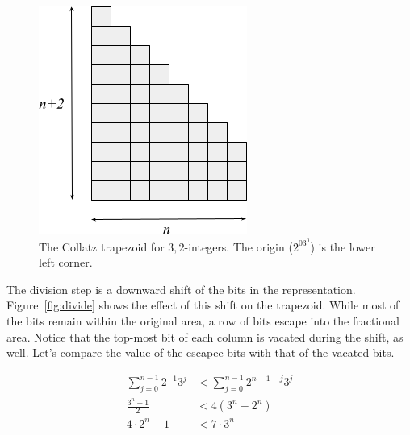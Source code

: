 \documentclass{article}
\begin{document}
\begin{figure}[H]
  \begin{center}
    \includegraphics[scale=0.5]{"Images/boundary"}
  \end{center}
  \caption{The Collatz trapezoid for ${3,2}$-integers. The origin ($2^03^0$) is
    the lower left corner.}
  \label{fig:boundary}
\end{figure}

The division step is a downward shift of the bits in the
representation. Figure~\ref{fig:divide} shows the effect of this shift on
the trapezoid. While most of the bits remain within the original area, a row of
bits escape into the fractional area. Notice that the top-most bit of each column is
vacated during the shift, as well. Let's compare the value of the escapee bits with that of
the vacated bits.

\begin{align*}
  \sum_{j=0}^{n-1}2^{-1}3^j &< \sum_{j=0}^{n-1}2^{n+1-j}3^j \\
  \frac{3^n-1}{2} &< 4(3^n - 2^n) \\
  4\cdot2^n - 1 &< 7\cdot3^n
\end{align*}
\end{document}
